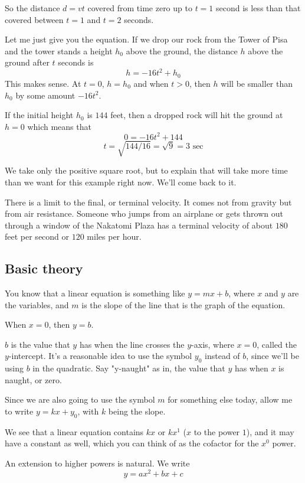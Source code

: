 \documentclass[11pt, oneside]{article}
\begin{document}
So the distance $d = vt$ covered from time zero up to $t = 1$ second is less than that covered between $t = 1$ and $t = 2$ seconds.  

Let me just give you the equation.  If we drop our rock from the Tower of Pisa and the tower stands a height $h_0$ above the ground, the distance $h$ above the ground after $t$ seconds is
\[ h = -16t^2 + h_0 \]
This makes sense.  At $t = 0$, $h = h_0$ and when $t > 0$, then $h$ will be smaller than $h_0$ by some amount $-16t^2$.

If the initial height $h_0$ is $144$ feet, then a dropped rock will hit the ground at $h=0$ which means that
\[ 0 = -16t^2 + 144 \]
\[ t = \sqrt{144/16} = \sqrt{9} = 3 \text{ sec} \]

We take only the positive square root, but to explain that will take more time than we want for this example right now.  We'll come back to it.

There is a limit to the final, or terminal velocity.  It comes not from gravity but from air resistance.  Someone who jumps from an airplane or gets thrown out through a window of the Nakatomi Plaza has a terminal velocity of about $180$ feet per second or $120$ miles per hour.

\subsection*{Basic theory}

You know that a linear equation is something like $y = mx + b$, where $x$ and $y$ are the variables, and $m$ is the slope of the line that is the graph of the equation. 

When  $x = 0$, then $y = b$.  

$b$ is the value that $y$ has when the line crosses the $y$-axis, where $x = 0$, called the $y$-intercept.  It's a reasonable idea to use the symbol $y_0$ instead of $b$, since we'll be using $b$ in the quadratic.  Say "y-naught" as in, the value that $y$ has when $x$ is naught, or zero.

Since we are also going to use the symbol $m$ for something else today, allow me to write $y = kx + y_0$, with $k$ being the slope.

We see that a linear equation contains $kx$ or $kx^1$ ($x$ to the power $1$), and it may have a constant as well, which you can think of as the cofactor for the $x^0$ power.

An extension to higher powers is natural.  We write
\[ y = ax^2 + bx + c \]
\end{document}
